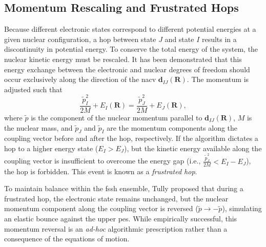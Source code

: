 \subsection{Momentum Rescaling and Frustrated Hops}
Because different electronic states correspond to different potential energies at a given nuclear configuration, a hop between state $J$ and state $I$ results in a discontinuity in potential energy. To conserve the total energy of the system, the nuclear kinetic energy must be rescaled. It has been demonstrated that this energy exchange between the electronic and nuclear degrees of freedom should occur exclusively along the direction of the \gls{nacv} $\symbf{d}_{IJ}(\symbf{R})$. The momentum is adjusted such that
\begin{equation}\label{eq:fssh_energy_conservation}
\frac{\tilde{p}_I^2}{2M}+E_I(\symbf{R})=\frac{\tilde{p}_J^2}{2M}+E_J(\symbf{R}),
\end{equation}
where $\tilde{p}$ is the component of the nuclear momentum parallel to $\symbf{d}_{IJ}(\symbf{R})$, $M$ is the nuclear mass, and $\tilde{p}_J$ and $\tilde{p}_I$ are the momentum components along the coupling vector before and after the hop, respectively. If the algorithm dictates a hop to a higher energy state ($E_I>E_J$), but the kinetic energy available along the coupling vector is insufficient to overcome the energy gap (i.e., $\frac{\tilde{p}_J^2}{2M}<E_I-E_J$), the hop is forbidden. This event is known as a \textit{frustrated hop}.

To maintain balance within the \gls{fssh} ensemble, Tully proposed that during a frustrated hop, the electronic state remains unchanged, but the nuclear momentum component along the coupling vector is reversed ($\tilde{p}\to-\tilde{p}$), simulating an elastic bounce against the upper \gls{pes}. While empirically successful, this momentum reversal is an \textit{ad-hoc} algorithmic prescription rather than a consequence of the equations of motion.
